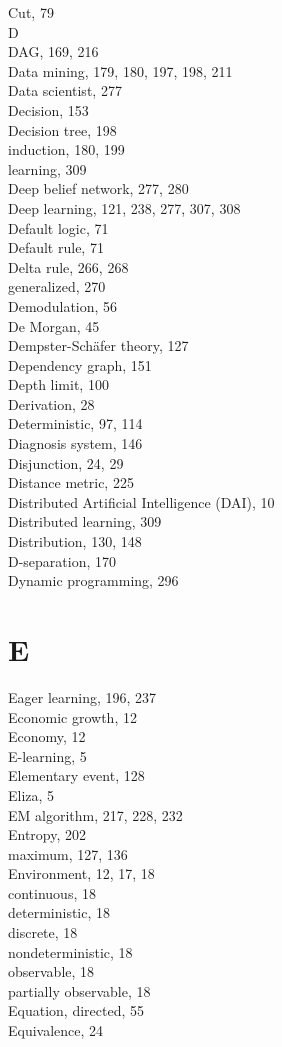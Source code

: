\documentclass[10pt]{book}
\begin{document}
Cut, 79\\
D\\
DAG, 169, 216\\
Data mining, 179, 180, 197, 198, 211\\
Data scientist, 277\\
Decision, 153\\
Decision tree, 198\\
induction, 180, 199\\
learning, 309\\
Deep belief network, 277, 280\\
Deep learning, 121, 238, 277, 307, 308\\
Default logic, 71\\
Default rule, 71\\
Delta rule, 266, 268\\
generalized, 270\\
Demodulation, 56\\
De Morgan, 45\\
Dempster-Schäfer theory, 127\\
Dependency graph, 151\\
Depth limit, 100\\
Derivation, 28\\
Deterministic, 97, 114\\
Diagnosis system, 146\\
Disjunction, 24, 29\\
Distance metric, 225\\
Distributed Artificial Intelligence (DAI), 10\\
Distributed learning, 309\\
Distribution, 130, 148\\
D-separation, 170\\
Dynamic programming, 296\\

\section{E}

Eager learning, 196, 237\\
Economic growth, 12\\
Economy, 12\\
E-learning, 5\\
Elementary event, 128\\
Eliza, 5\\
EM algorithm, 217, 228, 232\\
Entropy, 202\\
maximum, 127, 136\\
Environment, 12, 17, 18\\
continuous, 18\\
deterministic, 18\\
discrete, 18\\
nondeterministic, 18\\
observable, 18\\
partially observable, 18\\
Equation, directed, 55\\
Equivalence, 24\\
\end{document}
